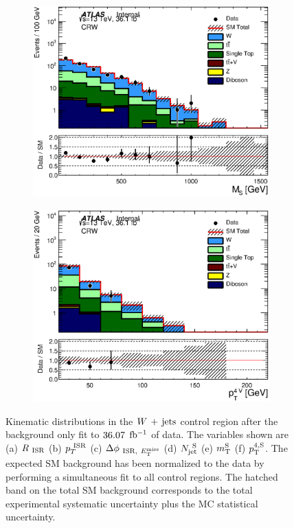 \begin{figure}[h!]
\begin{center}
\begin{subfigure}[b]{0.40\textwidth}
    	 \includegraphics[width=\textwidth]{figures/plotRegion/CA_MS_CRW_log.eps}
                \caption{ }
    \end{subfigure}
    \begin{subfigure}[b]{0.40\textwidth}    
    	 \includegraphics[width=\textwidth]{figures/plotRegion/CA_pTjV4_CRW_log.eps}
               \caption{ }
    \end{subfigure}
     \caption[Kinematic distributions in the $\Wjets$ control region after the background only fit to $\intlumi$ $\ifb$ of data]{ Kinematic distributions in the $\Wjets$ control region after the background only fit to $\intlumi$ $\ifb$ of data. The variables shown are (a) $R_{~\mathrm{ISR}}$ (b) $p_{T}^{~\mathrm{ISR}}$ (c) $\Delta\phi_{~\mathrm{ISR},~E_{\mathrm{T}}^{\mathrm{miss}}}$ (d) $N_{\mathrm{jet}}^{~\mathrm{S}}$ (e) $m_{\mathrm{T}}^{\mathrm{S}}$ (f) $p_{\mathrm{T}}^{4,\mathrm{S}}$. The expected SM background has been normalized to the data by performing a simultaneous fit to all control regions.  The hatched band on the total SM background corresponds to the total experimental systematic uncertainty plus the MC statistical uncertainty.   }
  \label{fig:CRW1}
    \end{center}
\end{figure}

